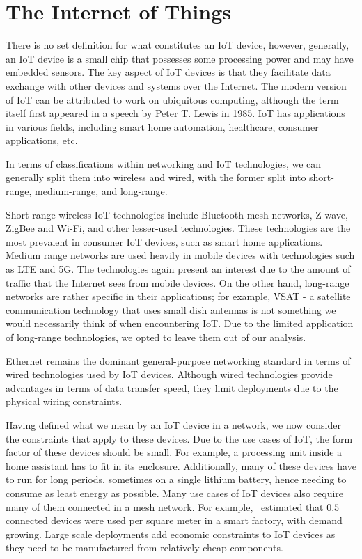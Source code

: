 \section{The Internet of Things}

There is no set definition for what constitutes an IoT device, however, generally, an IoT device is a small chip that possesses some processing power and may have embedded sensors.
The key aspect of IoT devices is that they facilitate data exchange with other devices and systems over the Internet.
The modern version of IoT can be attributed to work on ubiquitous computing, although the term itself first appeared in a speech by Peter T. Lewis in 1985.
IoT has applications in various fields, including smart home automation, healthcare, consumer applications, etc.

In terms of classifications within networking and IoT technologies, we can generally split them into wireless and wired, with the former split into short-range, medium-range, and long-range.

Short-range wireless IoT technologies include Bluetooth mesh networks, Z-wave, ZigBee and Wi-Fi, and other lesser-used technologies.
These technologies are the most prevalent in consumer IoT devices, such as smart home applications.
Medium range networks are used heavily in mobile devices with technologies such as LTE and 5G.
The technologies again present an interest due to the amount of traffic that the Internet sees from mobile devices.
On the other hand, long-range networks are rather specific in their applications; for example, VSAT - a satellite communication technology that uses small dish antennas is not something we would necessarily think of when encountering IoT.
Due to the limited application of long-range technologies, we opted to leave them out of our analysis.

Ethernet remains the dominant general-purpose networking standard in terms of wired technologies used by IoT devices.
Although wired technologies provide advantages in terms of data transfer speed, they limit deployments due to the physical wiring constraints.

Having defined what we mean by an IoT device in a network, we now consider the constraints that apply to these devices.
Due to the use cases of IoT, the form factor of these devices should be small.
For example, a processing unit inside a home assistant has to fit in its enclosure.
Additionally, many of these devices have to run for long periods, sometimes on a single lithium battery, hence needing to consume as least energy as possible.
Many use cases of IoT devices also require many of them connected in a mesh network.
For example,~\cite{ericsson_iot_2018} estimated that $0.5$ connected devices were used per square meter in a smart factory, with demand growing.
Large scale deployments add economic constraints to IoT devices as they need to be manufactured from relatively cheap components.


